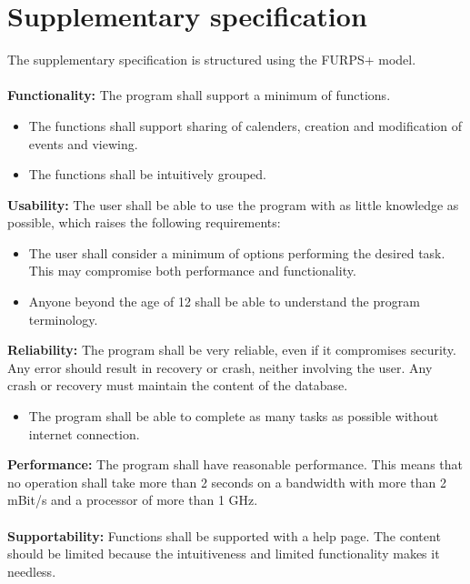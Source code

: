 \documentclass[a4paper,10pt,titlepage]{article}
\begin{document}
\section{Supplementary specification}
	The supplementary specification is structured using the FURPS+ model.
	\\ \\
	\textbf{Functionality:}
	The program shall support a minimum of functions.
	\begin{itemize}
	\item The functions shall support sharing of calenders, creation and modification of events and viewing.
	\item The functions shall be intuitively grouped.
	\\
	\end{itemize}
	\textbf{Usability:}
	The user shall be able to use the program with as little knowledge as possible, which raises the following requirements:
	\begin{itemize}
	\item The user shall consider a minimum of options performing the desired task. This may compromise both performance and functionality.
	\item Anyone beyond the age of 12 shall be able to understand the program terminology. 
	\\
	\end{itemize}
	\textbf{Reliability:}
	The program shall be very reliable, even if it compromises security. Any error should result in recovery or crash, neither involving the user. Any crash or recovery must maintain the content of the database.
	\begin{itemize}
	\item The program shall be able to complete as many tasks as possible without internet connection.
	\\
	\end{itemize}
	\textbf{Performance:}
	The program shall have reasonable performance. This means that no operation shall take more than 2 seconds on a bandwidth with more than 2 mBit/s and a processor of more than 1 GHz.
	\\ \\
	\textbf{Supportability:}
	Functions shall be supported with a help page. The content should be limited because the intuitiveness and limited functionality makes it needless.
	\\ \\
\end{document}

